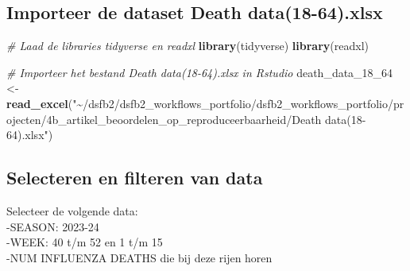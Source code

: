 \documentclass[
]{book}
\newenvironment{Shaded}{\begin{snugshade}}{\end{snugshade}}
\newcommand{\CommentTok}[1]{\textcolor[rgb]{0.56,0.35,0.01}{\textit{#1}}}
\newcommand{\FunctionTok}[1]{\textcolor[rgb]{0.13,0.29,0.53}{\textbf{#1}}}
\newcommand{\NormalTok}[1]{#1}
\newcommand{\OtherTok}[1]{\textcolor[rgb]{0.56,0.35,0.01}{#1}}
\newcommand{\StringTok}[1]{\textcolor[rgb]{0.31,0.60,0.02}{#1}}
\begin{document}
\subsection{Importeer de dataset Death data(18-64).xlsx}\label{importeer-de-dataset-death-data18-64.xlsx}

\begin{Shaded}
\begin{Highlighting}[]
\CommentTok{\# Laad de libraries tidyverse en readxl}
\FunctionTok{library}\NormalTok{(tidyverse)}
\FunctionTok{library}\NormalTok{(readxl)}

\CommentTok{\# Importeer het bestand Death data(18{-}64).xlsx in Rstudio}
\NormalTok{death\_data\_18\_64 }\OtherTok{\textless{}{-}}\FunctionTok{read\_excel}\NormalTok{(}\StringTok{"\textasciitilde{}/dsfb2/dsfb2\_workflows\_portfolio/dsfb2\_workflows\_portfolio/projecten/4b\_artikel\_beoordelen\_op\_reproduceerbaarheid/Death data(18{-}64).xlsx"}\NormalTok{)}
\end{Highlighting}
\end{Shaded}

\subsection{Selecteren en filteren van data}\label{selecteren-en-filteren-van-data}

Selecteer de volgende data:\\
-SEASON: 2023-24\\
-WEEK: 40 t/m 52 en 1 t/m 15\\
-NUM INFLUENZA DEATHS die bij deze rijen horen\\
\end{document}
